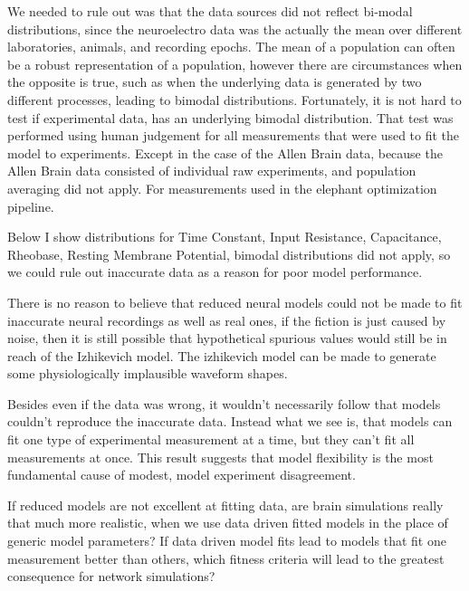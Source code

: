 We needed to rule out was that the data sources did not reflect bi-modal distributions, since the neuroelectro data was the actually the mean over different laboratories, animals, and recording epochs. The mean of a population can often be a robust representation of a population, however there are circumstances when the opposite is true, such as when the underlying data is generated by two different processes, leading to bimodal distributions. Fortunately, it is not hard to test if experimental data, has an underlying bimodal distribution. That test was performed using human judgement for all measurements that were used to fit the model to experiments. Except in the case of the Allen Brain data, because the Allen Brain data consisted of individual raw experiments, and population averaging did not apply. For measurements used in the elephant optimization pipeline.

Below I show distributions for  Time Constant, Input Resistance, Capacitance, Rheobase, Resting Membrane Potential, bimodal distributions did not apply, so we could rule out inaccurate data as a reason for poor model performance.

There is no reason to believe that reduced neural models could not be made to fit inaccurate neural recordings as well as real ones, if the fiction is just caused by noise, then it is still possible that hypothetical spurious values would still be in reach of the Izhikevich model. The izhikevich model can be made to generate some physiologically implausible waveform shapes. 

Besides even if the data was wrong, it wouldn't necessarily follow that models couldn't reproduce the inaccurate data. Instead what we see is, that models can fit one type of experimental measurement at a time, but they can't fit all measurements at once. This result suggests that model flexibility is the most fundamental cause of modest, model experiment disagreement.


If reduced models are not excellent at fitting data, are brain simulations really that much more realistic, when we use data driven fitted models in the place of generic model parameters? If data driven model fits lead to models that fit one measurement better than others, which fitness criteria will lead to the greatest consequence for network simulations?


